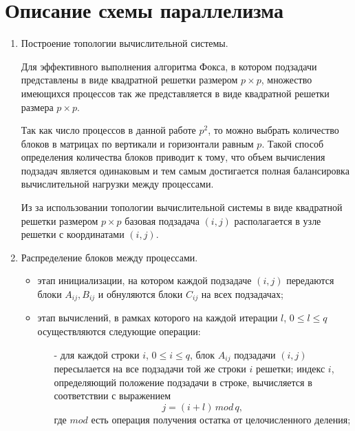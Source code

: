 \documentclass{report}
\begin{document}
\newpage

\section*{Описание схемы параллелизма}

\begin{enumerate}
    \item Построение топологии вычислительной системы.
        \par Для эффективного выполнения алгоритма Фокса, в котором подзадачи представлены в виде квадратной решетки размером {\itshape $p \times p$}, множество имеющихся процессов так же представляется в виде квадратной решетки размера {\itshape $p \times p$}.
        \par Так как число процессов в данной работе $p^2$, то можно выбрать количество блоков в матрицах по вертикали и горизонтали равным {\itshape $p$}. Такой способ определения количества блоков приводит к тому, что объем вычисления подзадач является одинаковым и тем самым достигается полная балансировка вычислительной нагрузки между процессами.
        \par Из за использовании топологии вычислительной системы в виде квадратной решетки размером {\itshape $p \times p$} базовая подзадача {\itshape $(i,j)$} располагается в узле решетки с координатами {\itshape $(i,j)$}.
    \item Распределение блоков между процессами.
        \begin{itemize}
            \item этап инициализации, на котором каждой подзадаче {\itshape $(i,j)$} передаются блоки {\itshape $A_{ij}, B_{ij}$} и обнуляются блоки {\itshape $C_{ij}$} на всех подзадачах;
            \item этап вычислений, в рамках которого на каждой итерации {\itshape $l$}, {\itshape $0 \le l \le q$} осуществляются следующие операции:
            \begin{itemize}
                \item[-] для каждой строки {\itshape $i$}, {\itshape $0 \le i \le q$}, блок {\itshape $A_{ij}$} подзадачи {\itshape $(i,j)$} пересылается на все подзадачи той же строки {\itshape $i$} решетки; индекс {\itshape $i$}, определяющий положение подзадачи в строке, вычисляется в соответствии с выражением
                $$
                {\mathit j = (i + l) \, mod \, q,}
                $$
                где {\itshape $mod$} есть операция получения остатка от целочисленного деления;

\end{itemize}
\end{itemize}
\end{enumerate}
\end{document}
